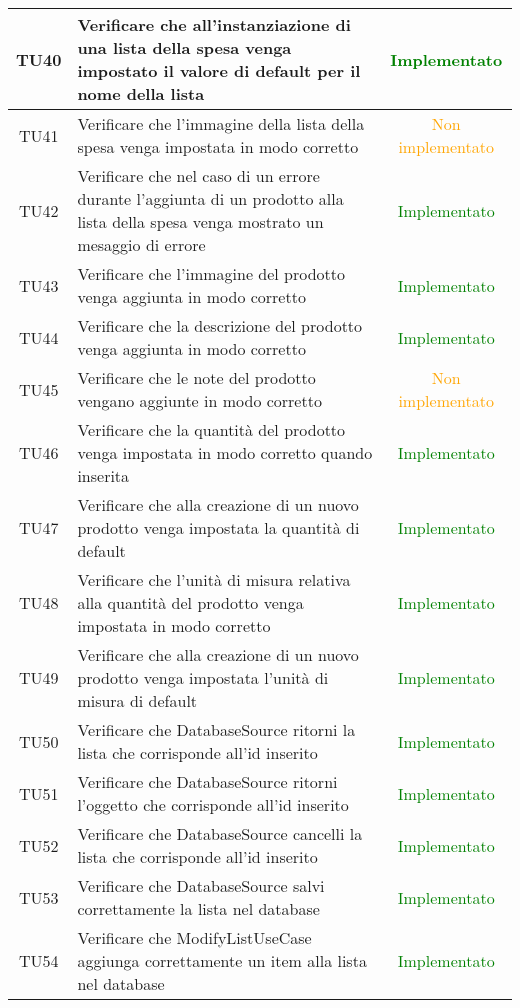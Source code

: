 \begin{center}
\begin{longtable}{|c|>{\centering}m{10cm}|c|}
		TU40 & Verificare che all'instanziazione di una lista della spesa venga impostato il valore di default per il nome della lista & \textcolor{Green}{Implementato}\\ \hline
		TU41 & Verificare che l'immagine della lista della spesa venga impostata in modo corretto & \textcolor{Orange}{Non implementato}\\ \hline
		TU42 & Verificare che nel caso di un errore durante l'aggiunta di un prodotto alla lista della spesa venga mostrato un mesaggio di errore & \textcolor{Green}{Implementato}\\ \hline
		TU43 & Verificare che l'immagine del prodotto venga aggiunta in modo corretto & \textcolor{Green}{Implementato}\\ \hline
		TU44 & Verificare che la descrizione del prodotto venga aggiunta in modo corretto & \textcolor{Green}{Implementato}\\ \hline
		TU45 & Verificare che le note del prodotto vengano aggiunte in modo corretto & \textcolor{Orange}{Non implementato}\\ \hline
		TU46 & Verificare che la quantità del prodotto venga impostata in modo corretto quando inserita & \textcolor{Green}{Implementato}\\ \hline
		TU47 & Verificare che alla creazione di un nuovo prodotto venga impostata la quantità di default & \textcolor{Green}{Implementato}\\ \hline
		TU48 & Verificare che l'unità di misura relativa alla quantità del prodotto venga impostata in modo corretto & \textcolor{Green}{Implementato}\\ \hline
		TU49 & Verificare che alla creazione di un nuovo prodotto venga impostata l'unità di misura di default & \textcolor{Green}{Implementato}\\ \hline
		TU50 & Verificare che DatabaseSource ritorni la lista che corrisponde all'id inserito & \textcolor{Green}{Implementato}\\ \hline
		TU51 & Verificare che DatabaseSource ritorni l'oggetto che corrisponde all'id inserito & \textcolor{Green}{Implementato}\\ \hline
		TU52 & Verificare che DatabaseSource cancelli la lista che corrisponde all'id inserito & \textcolor{Green}{Implementato}\\ \hline
		TU53 & Verificare che DatabaseSource salvi correttamente la lista nel database & \textcolor{Green}{Implementato}\\ \hline
		TU54 & Verificare che ModifyListUseCase aggiunga correttamente un item alla lista nel database & \textcolor{Green}{Implementato}\\ \hline

\end{longtable}
\end{center}
